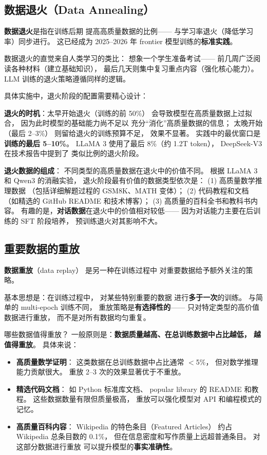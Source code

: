 \subsection{数据退火（Data Annealing）}

\textbf{数据退火}是指在训练后期
提高高质量数据的比例——
与学习率退火（降低学习率）同步进行。
这已经成为 2025--2026 年 frontier 模型训练的\textbf{标准实践}。

数据退火的直觉来自人类学习的类比：
想象一个学生准备考试——
前几周广泛阅读各种材料（建立基础知识），
最后几天则集中复习重点内容（强化核心能力）。
LLM 训练的退火策略遵循同样的逻辑。

具体实施中，退火阶段的配置需要精心设计：

\textbf{退火的时机}：太早开始退火（训练的前 50\%）
会导致模型在高质量数据上过拟合，
因为此时模型的基础能力尚不足以
充分``消化''高质量数据的信息；
太晚开始（最后 2--3\%）
则留给退火的训练预算不足，
效果不显著。
实践中的最优窗口是\textbf{训练的最后 5--10\%}。
LLaMA 3 使用了最后 8\%（约 1.2T token），
DeepSeek-V3 在技术报告中提到了
类似比例的退火阶段。

\textbf{退火数据的组成}：
不同类型的高质量数据在退火中的价值不同。
根据 LLaMA 3 和 Qwen3 的消融实验，
退火阶段最有价值的数据类型依次是：
(1) 高质量数学推理数据
（包括详细解题过程的 GSM8K、MATH 变体）；
(2) 代码教程和文档
（如精选的 GitHub README 和技术博客）；
(3) 高质量的百科全书和教科书内容。
有趣的是，\textbf{对话数据}在退火中的价值相对较低——
因为对话能力主要在后训练的 SFT 阶段培养，
预训练退火对其影响不大。

\subsection{重要数据的重放}

\textbf{数据重放}（data replay）
是另一种在训练过程中
对重要数据给予额外关注的策略。

基本思想是：在训练过程中，
对某些特别重要的数据
进行\textbf{多于一次}的训练。
与简单的 multi-epoch 训练不同，
重放策略是\textbf{有选择性的}——
只对特定类型的高价值数据进行重放，
而不是对所有数据均匀重复。

哪些数据值得重放？
一般原则是：\textbf{数据质量越高、在总训练数据中占比越低，
越值得重放}。
具体来说：

\begin{itemize}[noitemsep]
  \item \textbf{高质量数学证明}：
        这类数据在总训练数据中占比通常 $<$5\%，
        但对数学推理能力贡献很大。
        重放 2--3 次的效果显著优于不重放。
  \item \textbf{精选代码文档}：
        如 Python 标准库文档、
        popular library 的 README 和教程。
        这些数据数量有限但质量极高，
        重放可以强化模型对 API 和编程模式的记忆。
  \item \textbf{高质量百科内容}：
        Wikipedia 的特色条目（Featured Articles）
        约占 Wikipedia 总条目数的 0.1\%，
        但在信息密度和写作质量上远超普通条目。
        对这部分数据进行重放
        可以提升模型的\textbf{事实准确性}。
\end{itemize}

